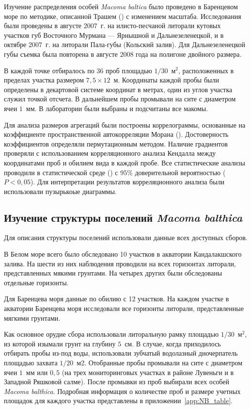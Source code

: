 Изучение распределения особей {\it Macoma baltica} было проведено в Баренцевом море по методике, описанной Трашем (\cite{Thrush_et_al_1989}) с изменением масштаба.
Исследования были проведены в августе $2007$~г. на илисто-песчаной литорали кутовых участков губ Восточного Мурмана --- Ярнышной и Дальнезеленецкой, и в октябре $2007$~г. на литорали Пала-губы (Кольский залив). 
Для Дальнезеленецкой губы съемка была повторена в августе $2008$ года на полигоне двойного размера.

В каждой точке отбиралось по $36$ проб площадью $1/30$~м$^2$, расположенных в пределах участка размером $7,5 \times 12$~м. 
Координаты каждой пробы были определены в декартовой системе координат в метрах, один из углов участка служил точкой отсчета. 
В дальнейшем пробы промывали на сите с диаметром ячеи $1$~мм. 
В лаборатории были выбраны и  подсчитаны все макомы.

Для анализа размеров агрегаций были построены коррелограммы, основанные на коэффициенте пространственной автокорреляции Морана (\cite{ncf}).
Достоверность коэффициентов определяли пермутационным методом.
Наличие градиентов проверяли с использованием корреляционного анализа Кендалла между координатами проб и обилием вида в каждой пробе. 
Все статистические анализы проводили в статистической среде \R{} (\cite{R_2014}) с $95\%$ доверительной вероятностью ($P < 0,05$).
Для интерпретации результатов корреляционного анализа были использовали пузырькоые диаграммы.

	
	\subsection{Изучение структуры поселений {\it Macoma balthica}}
Для описания структуры поселений использовали данные всех доступных сборов.

В Белом море всего было обследовано 10 участков в акватории Кандалакшского залива. 
На шести из них наблюдения проводили на всех горизонтах литорали, представленных мякими грунтами.
На четырех других были обследованы отдельные горизонты. 

Для Баренцева моря данные по обилию с 12 участков. На каждом участке в акватории Баренцева моря исследовали все  горизонты литорали, представленные мягкими грунтами.  

Как основное орудие сбора использовали литоральную рамку площадью $1/30$~м$^2$, из которой изымали грунт на глубину $5$~см. 
В случае, когда приходилось отбирать пробы из-под воды, использовали зубчатый водолазный дночерпатель площадью захвата $1/20$~м2.
Отобранные пробы промывали на сите с диаметром ячеи $1$~мм или $0,5$ (на трех мониторинговых участках в районе Лувеньги и в Западной Ряшковой салме). 
После промывки из   проб   выбирали   всех   особей  {\it Macoma balthica}.
Подробная информация о количестве проб и размере учетных площадок для каждого участка представлены в приложении~\ref{app:NB_table}.

